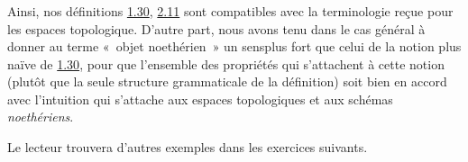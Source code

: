 \setcounter{subsection}{15}
\setcounter{subsubsection}{0}
\subsubsection{}
Ainsi, nos définitions \hyperref[VI.def1.30]{1.30}, \hyperref[VI.def2.11]{2.11} sont compatibles avec la
terminologie reçue pour les espaces topologique. D'autre part, nous
avons tenu dans le cas général à donner au terme « objet
noethérien » un sens\pageoriginale plus fort que celui de la notion
plus naïve de \hyperref[VI.def1.30]{1.30}, pour que l'ensemble des propriétés qui s'attachent à cette
notion (plutôt que la seule structure grammaticale de la définition)
soit bien en accord avec l'intuition qui s'attache aux espaces
topologiques et aux schémas \emph{noethériens}.

Le lecteur trouvera d'autres exemples dans les exercices suivants.

